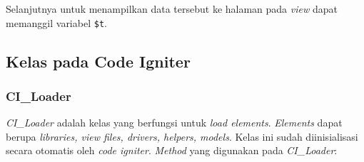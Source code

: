 Selanjutnya untuk menampilkan data tersebut ke halaman pada \textit{view} dapat memanggil variabel \texttt{\$t}.


\subsection{Kelas pada Code Igniter}
\subsubsection{CI\_Loader}
\textit{CI\_Loader} adalah kelas yang berfungsi untuk \textit{load elements}. \textit{Elements} dapat berupa \textit{libraries, view files, drivers, helpers, models}. Kelas ini sudah diinisialisasi secara otomatis oleh \textit{code igniter}. \textit{Method} yang digunakan pada \textit{CI\_Loader}:

